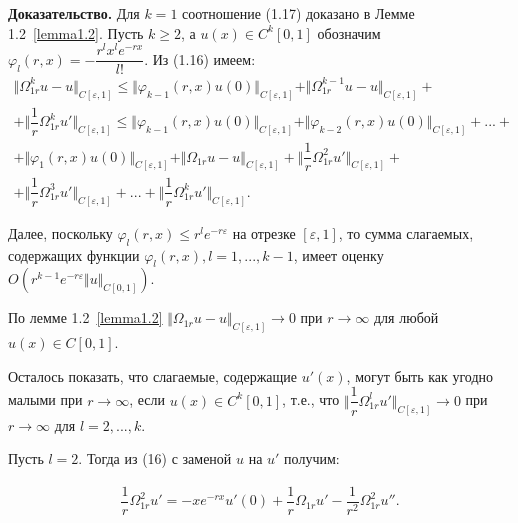 \textbf{Доказательство.} Для $ k = 1 $ соотношение (1.17) доказано в Лемме 1.2~\eqref{lemma1.2}.
Пусть $ k \geq 2 $, а $ u(x) \in C^k[0,1] $ обозначим $ \varphi_l(r,x) = - \dfrac{r^lx^le^{-rx}}{l!} $.
Из (1.16) имеем:
\begin{equation}
\begin{array}{c}
\nonumber

\Vert \Omega_{1r}^ku - u \Vert_{C[\varepsilon ,1]} \leq \Vert \varphi_{k-1}(r,x)u(0) \Vert_{C[\varepsilon, 1]} + \Vert \Omega_{1r}^{k-1}u - u \Vert_{C[\varepsilon ,1]} + \\
+ \biggl\Vert \dfrac{1}{r}\Omega_{1r}^ku' \biggr\Vert_{C[\varepsilon, 1]} \leq \Vert \varphi_{k-1}(r,x)u(0) \Vert_{C[\varepsilon, 1]} + \Vert \varphi_{k-2}(r,x)u(0) \Vert_{C[\varepsilon, 1]} + ... + \\
+ \Vert \varphi_1(r,x)u(0) \Vert_{C[\varepsilon, 1]} + \Vert \Omega_{1r}u - u \Vert_{C[\varepsilon ,1]} + \biggl\Vert \dfrac{1}{r}\Omega_{1r}^2u' \biggr\Vert_{C[\varepsilon, 1]} + \\
+ \biggl\Vert \dfrac{1}{r}\Omega_{1r}^3u' \biggr\Vert_{C[\varepsilon, 1]} + ... + \biggl\Vert \dfrac{1}{r}\Omega_{1r}^ku' \biggr\Vert_{C[\varepsilon, 1]}.
\end{array}
\end{equation}

Далее, поскольку $ \varphi_l(r,x) \leq r^le^{-r\varepsilon} $ на отрезке $ [\varepsilon ,1] $, то сумма слагаемых, содержащих функции $ \varphi_l(r,x), l = 1,...,k-1  $, имеет оценку $ O(r^{k-1}e^{-r\varepsilon}\Vert u \Vert_{C[0,1]}) $.

По лемме 1.2~\eqref{lemma1.2} $ \Vert \Omega_{1r}u - u \Vert_{C[\varepsilon ,1]} \rightarrow 0 $ при $ r \rightarrow \infty $ для любой $ u(x) \in C[0,1] $. 

Осталось показать, что слагаемые, содержащие $ u'(x) $, могут быть как угодно малыми при $ r \rightarrow \infty $, если $ u(x) \in C^k[0,1] $, т.е., что $ \bigl\Vert \dfrac{1}{r}\Omega_{1r}^lu' \bigr\Vert_{C[\varepsilon ,1]} \rightarrow 0$ при $ r \rightarrow \infty $ для $ l = 2,...,k $.

Пусть $ l = 2 $. Тогда из (16) с заменой $ u $ на $ u' $ получим:

\begin{equation}
\begin{array}{c}
\nonumber

\dfrac{1}{r}\Omega_{1r}^2u' = -xe^{-rx}u'(0) + \dfrac{1}{r}\Omega_{1r}u' - \dfrac{1}{r^2}\Omega_{1r}^2u''.

\end{array}
\end{equation}

